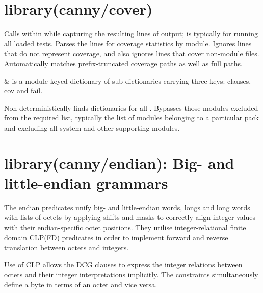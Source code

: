 \chapter{library(canny/cover)}\label{sec:cover}

\begin{description}
Calls  within  while capturing the resulting
lines of output;  is typically  for running all
loaded tests. Parses the lines for coverage statistics by module.
Ignores lines that do not represent coverage, and also ignores lines
that cover non-module files. Automatically matches prefix-truncated
coverage paths as well as full paths.

\begin{arguments}
 & is a module-keyed dictionary of sub-dictionaries
carrying three keys: clauses, cov and fail. \\
\end{arguments}

Non-deterministically finds  dictionaries for all .
Bypasses those modules excluded from the required list, typically
the list of modules belonging to a particular pack and excluding all
system and other supporting modules.
\end{description}

\chapter{library(canny/endian): Big- and little-endian grammars}\label{sec:endian}

The endian predicates unify big- and little-endian words, longs and
long words with lists of octets by applying shifts and masks to
correctly align integer values with their endian-specific octet
positions. They utilise integer-relational finite domain CLP(FD)
predicates in order to implement forward and reverse translation
between octets and integers.

Use of CLP allows the DCG clauses to express the integer relations
between octets and their integer interpretations implicitly. The
constraints simultaneously define a byte in terms of an octet and
vice versa.\vspace{0.7cm}

